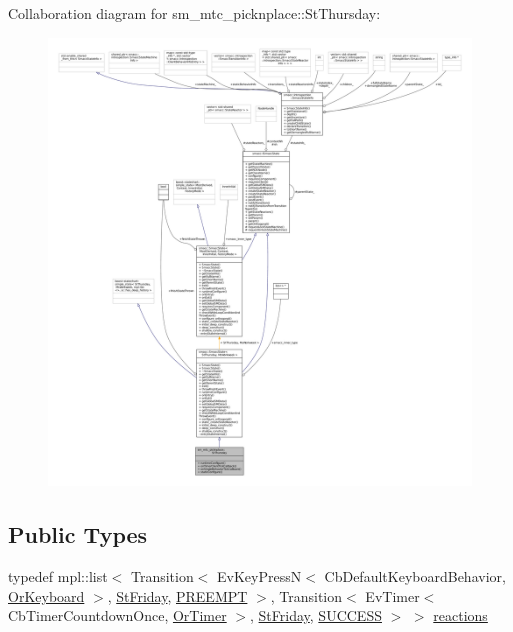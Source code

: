 Collaboration diagram for sm\+\_\+mtc\+\_\+picknplace\+:\+:St\+Thursday\+:
\nopagebreak
\begin{figure}[H]
\begin{center}
\leavevmode
\includegraphics[width=350pt]{structsm__mtc__picknplace_1_1StThursday__coll__graph}
\end{center}
\end{figure}
\subsection*{Public Types}
\begin{DoxyCompactItemize}
\item 
typedef mpl\+::list$<$ Transition$<$ Ev\+Key\+PressN$<$ Cb\+Default\+Keyboard\+Behavior, \hyperlink{classsm__mtc__picknplace_1_1OrKeyboard}{Or\+Keyboard} $>$, \hyperlink{structsm__mtc__picknplace_1_1StFriday}{St\+Friday}, \hyperlink{classPREEMPT}{P\+R\+E\+E\+M\+PT} $>$, Transition$<$ Ev\+Timer$<$ Cb\+Timer\+Countdown\+Once, \hyperlink{classsm__mtc__picknplace_1_1OrTimer}{Or\+Timer} $>$, \hyperlink{structsm__mtc__picknplace_1_1StFriday}{St\+Friday}, \hyperlink{classSUCCESS}{S\+U\+C\+C\+E\+SS} $>$ $>$ \hyperlink{structsm__mtc__picknplace_1_1StThursday_a2014e5f1e4bfb30e1bea12d98b51b9f8}{reactions}
\end{DoxyCompactItemize}
